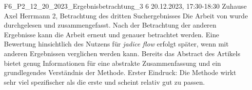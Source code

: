 \fieldnote
{F6\_P2\_12\_20\_2023\_Ergebnisbetrachtung\_3}
{6}
{20.12.2023, 17:30-18:30}
{Zuhause}
{Axel Herrmann}
{2, Betrachtung des dritten Suchergebnisses}
{
	Die Arbeit von  wurde durchgelesen und zusammengefasst.
}
{
	Nach der Betrachtung der anderen Ergebnisse kann die Arbeit erneut und genauer betrachtet werden.
	Eine Bewertung hinsichtlich des Nutzens für \emph{jadice flow} erfolgt später, wenn mit anderen Ergebnissen verglichen werden kann.
}
{
  Bereits das Abstract des Artikels bietet genug Informationen für eine abstrakte Zusammenfassung und ein grundlegendes Verständnis der Methode.
}
{}
{
	Erster Eindruck: Die Methode wirkt sehr viel spezifischer als die erste und scheint relativ gut zu passen.
}
